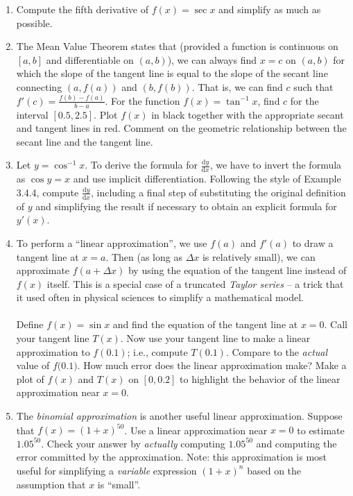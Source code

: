 \documentclass[10.5pt,twoside]{report}
\theoremstyle{definition}
\begin{document}
\begin{enumerate}
\item Compute the fifth derivative of $f(x)=\sec{x}$ and simplify as much as possible.

\item The Mean Value Theorem states that (provided a function is continuous on $[a,b]$ and differentiable on $(a,b)$), we can always find $x=c$ on $(a,b)$ for which the slope of the tangent line is equal to the slope of the secant line connecting $(a,f(a))$ and $(b,f(b))$.  That is, we can find $c$ such that $f'(c)=\frac{f(b)-f(a)}{b-a}$.  For the function $f(x)=\tan^{-1}{x}$, find $c$ for the interval $[0.5,2.5]$.  Plot $f(x)$ in black together with the appropriate secant and tangent lines in red.  Comment on the geometric relationship between the secant line and the tangent line.

\item Let $y=\cos^{-1}{x}$.  To derive the formula for $\frac{\mathrm{d}y}{\mathrm{d}x}$, we have to invert the formula as $\cos{y}=x$ and use implicit differentiation.  Following the style of Example 3.4.4, compute $\frac{\mathrm{d}y}{\mathrm{d}x}$, including a final step of substituting the original definition of $y$ and simplifying the result if necessary to obtain an explicit formula for $y'(x)$.

\item To perform a ``linear approximation'', we use $f(a)$ and $f'(a)$ to draw a tangent line at $x=a$.  Then (as long as $\Delta{x}$ is relatively small), we can approximate $f(a+\Delta{x})$ by using the equation of the tangent line instead of $f(x)$ itself. This is a special case of a truncated \textit{Taylor series} -- a trick that it used often in physical sciences to simplify a mathematical model.  \\
${}$\\
Define $f(x)=\sin{x}$ and find the equation of the tangent line at $x=0$.  Call your tangent line $T(x)$.  Now use your tangent line to make a linear approximation to $f(0.1)$; i.e., compute $T(0.1)$.  Compare to the \textit{actual} value of $f{(0.1})$.  How much error does the linear approximation make?  Make a plot of $f(x)$ and $T(x)$ on $[0,0.2]$ to highlight the behavior of the linear approximation near $x=0$.

\item The \textit{binomial approximation} is another useful linear approximation.  Suppose that $f(x)=(1+x)^{50}$.  Use a linear approximation near $x=0$ to estimate $1.05^{50}$.  Check your answer by \textit{actually} computing $1.05^{50}$ and computing the error committed by the approximation.  Note:  this approximation is most useful for simplifying a \textit{variable} expression $(1+x)^n$ based on the assumption that $x$ is ``small''.


\end{enumerate}
\end{document}
